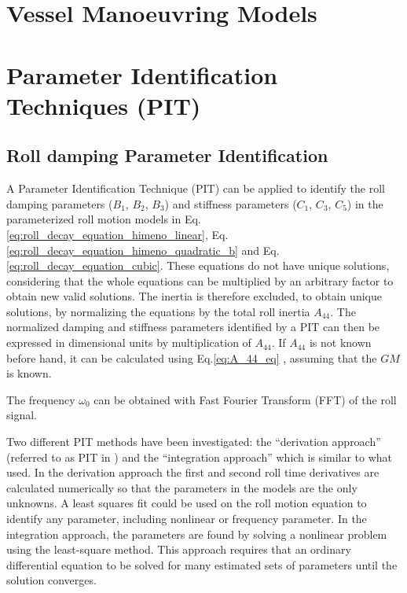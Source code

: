 



\section{Vessel Manoeuvring Models} \label{sec:VMM}


\section{Parameter Identification Techniques (PIT)}

\subsection{Roll damping Parameter Identification} \label{sec:PIT_roll}
\noindent A Parameter Identification Technique (PIT) can be applied to identify the roll damping parameters ($B_1$, $B_2$, $B_3$) and stiffness parameters ($C_1$, $C_3$, $C_5$) in the parameterized roll motion models in Eq.\ref{eq:roll_decay_equation_himeno_linear}, Eq.\ref{eq:roll_decay_equation_himeno_quadratic_b} and Eq.\ref{eq:roll_decay_equation_cubic}. These equations do not have unique solutions, considering that the whole equations can be multiplied by an arbitrary factor to obtain new valid solutions. The inertia is therefore excluded, to obtain unique solutions, by normalizing the equations by the total roll inertia $A_{44}$.
The normalized damping and stiffness parameters identified by a PIT can then be expressed in dimensional units by multiplication of $A_{44}$. If $A_{44}$ is not known before hand, it can be calculated using Eq.\ref{eq:A_44_eq} \cite{piehl_ship_2016}, assuming that the $GM$ is known.

\noindent The frequency $\omega_0$ can be obtained with Fast Fourier Transform (FFT) of the roll signal. 

Two different PIT methods have been investigated: the ``derivation approach'' (referred to as PIT in \parencite{imo_1200_2006}) and the ``integration approach'' which is similar to what \parencite{soder_assessment_2019} used. In the derivation approach the first and second roll time derivatives are calculated numerically so that the parameters in the models are the only unknowns. A least squares fit could be used on the roll motion equation to identify any parameter, including nonlinear or frequency parameter. In the integration approach, the parameters are found by solving a nonlinear problem using the least-square method. This approach requires that an ordinary differential equation to be solved for many estimated sets of parameters until the solution converges.

